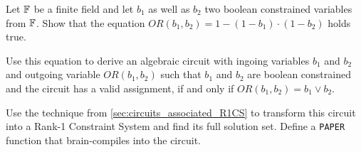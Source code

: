 \begin{exercise} Let $\mathbb{F}$ be a finite field and let $b_1$ as well as $b_2$ two boolean constrained variables from $\mathbb{F}$. Show that the equation 
$OR(b_1,b_2) = 1 - (1 - b_1)\cdot (1 - b_2)$ holds true.

Use this equation to derive an algebraic circuit with ingoing variables $b_1$ and $b_2$ and outgoing variable $OR(b_1,b_2)$ such that $b_1$ and $b_2$ are boolean constrained and the circuit has a valid assignment, if and only if $OR(b_1,b_2) = b_1 \vee b_2$.  

Use the technique from \ref{sec:circuits_associated_R1CS} to transform this circuit into a Rank-1 Constraint System and find its full solution set. Define a \texttt{PAPER} function that brain-compiles into the circuit. 
\begin{comment}
\begin{center}
\digraph[scale=0.4]{BOOLOR}{
  forcelabels=true;
  center=true;
  splines=ortho;
  nodesep= 2.0;
  nOR1 -> nOR5 [xlabel="S_1  "] ;
  nOR2 -> nOR7 [xlabel="S_2  "] ;
  nOR3 -> {nOR5, nOR7, nOR10} ;
  nOR4 -> {nOR6, nOR8, nOR11} ;
  nOR5 -> nOR6; 
  nOR6 -> nOR9 ;
  nOR7 -> nOR8 ;
  nOR8 -> nOR9 ;
  nOR9 -> nOR10 [xlabel="S_3  "] ;
  nOR10 -> nOR11 ;
  nOR11 -> nOR12 [xlabel="S_4  "] ;

  nOR1 [shape=box, label="b_1"] ;
  nOR2 [shape=box, label="b_2"] ;
  nOR3 [shape=box, label="-1"] ;
  nOR4 [shape=box, label="1"] ;
  nOR5 [label="*"] ;
  nOR6 [label="+"] ;
  nOR7 [label="*"] ;
  nOR8 [label="+"] ;
  nOR9 [label="*"] ;
  nOR10 [label="*"] ;
  nOR11 [label="+"] ;
  nOR12 [shape=box, label="OR(b_1,b_2)"] ;
}
\end{center}
The associated Rank-1 Constraint System can be deduced from the general process \ref{sec:circuits_associated_R1CS} and consists of the following constraints
\begin{align*}
 (1- S_1) \cdot (1-S_2) & = S_3\\
  (1-S_3)\cdot 1 &= S_4
\end{align*}
Common circuit languages typically provide a gadget or a function to abstract over this circuit such that programers can use the $\vee$ operator without caring about the associated circuit. In \texttt{PAPER}, we define the following function that compiles to the $\vee$-operator's circuit:
\begin{lstlisting}
fn OR(b_1 : BOOL, b_2 : BOOL) -> OR(b_1,b_2) : BOOL{
  l
  constant c1 = 1 ;
  constant c2 = -1 ;
  OR(b_1,b_2) <== ADD(c1,MUL(MUL(ADD(c1,MUL(b_1,c2)),ADD(c1,MUL(b_1,c2))),c2))  ;
}
\end{lstlisting}
In the setup phase of a statement, we compile every occurrence of the $\mathtt{OR}$ function into an instance of its associated $\vee$-operator's circuit.
\end{comment} 
\end{exercise}
